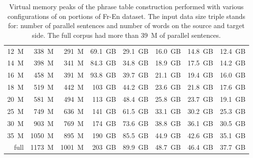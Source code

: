 \begin{table}[!htb]
\begin{tabular}{ | r  r  r | r  r  r  r  r | }
12~M & 338~M & 291~M & 69.1~GB & 29.1~GB & 16.0~GB & 14.8~GB & 12.4~GB \\
14~M & 398~M & 341~M & 84.3~GB & 34.8~GB & 18.9~GB & 17.5~GB & 14.2~GB \\
16~M & 458~M & 391~M & 93.8~GB & 39.7~GB & 21.1~GB & 19.4~GB & 16.0~GB \\
18~M & 519~M & 442~M & 103~GB & 44.2~GB & 23.6~GB & 21.8~GB & 17.6~GB \\
20~M & 581~M & 494~M & 113~GB & 48.4~GB & 25.8~GB & 23.7~GB & 19.1~GB \\
25~M & 749~M & 636~M & 141~GB & 61.5~GB & 33.1~GB & 30.2~GB & 25.3~GB \\
30~M & 903~M & 769~M & 174~GB & 73.6~GB & 38.8~GB & 36.1~GB & 30.5~GB \\
35~M & 1050~M & 895~M & 190~GB & 85.5~GB & 44.9~GB & 42.6~GB & 35.1~GB \\
full & 1173~M & 1001~M & 203~GB & 89.9~GB & 48.7~GB & 46.4~GB & 37.7~GB \\
\hline
\end{tabular}
\caption{\label{fr-en-memory-benchmarking}
Virtual memory peaks of the phrase table construction performed with
various configurations of \eppex{} on portions of Fr-En dataset.
The input data size triple stands for: number of parallel sentences and number of words on the source and target side.
The full corpus had more than 39~M of parallel sentences.}
\end{table}

